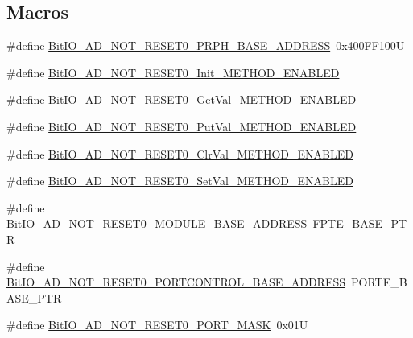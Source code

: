\subsection*{Macros}
\begin{DoxyCompactItemize}
\item 
\#define \hyperlink{group___bit_i_o___a_d___n_o_t___r_e_s_e_t0__module_ga437949927fe2782ca297b0acd3cacffa}{Bit\-I\-O\-\_\-\-A\-D\-\_\-\-N\-O\-T\-\_\-\-R\-E\-S\-E\-T0\-\_\-\-P\-R\-P\-H\-\_\-\-B\-A\-S\-E\-\_\-\-A\-D\-D\-R\-E\-S\-S}~0x400\-F\-F100\-U
\item 
\#define \hyperlink{group___bit_i_o___a_d___n_o_t___r_e_s_e_t0__module_ga95951412f710bccbd47b14a4e7c657a2}{Bit\-I\-O\-\_\-\-A\-D\-\_\-\-N\-O\-T\-\_\-\-R\-E\-S\-E\-T0\-\_\-\-Init\-\_\-\-M\-E\-T\-H\-O\-D\-\_\-\-E\-N\-A\-B\-L\-E\-D}
\item 
\#define \hyperlink{group___bit_i_o___a_d___n_o_t___r_e_s_e_t0__module_gaa8ca61ecfbf61ff04f201a68606fa657}{Bit\-I\-O\-\_\-\-A\-D\-\_\-\-N\-O\-T\-\_\-\-R\-E\-S\-E\-T0\-\_\-\-Get\-Val\-\_\-\-M\-E\-T\-H\-O\-D\-\_\-\-E\-N\-A\-B\-L\-E\-D}
\item 
\#define \hyperlink{group___bit_i_o___a_d___n_o_t___r_e_s_e_t0__module_ga867a3bb8028ec506efd23bc79b0e6b21}{Bit\-I\-O\-\_\-\-A\-D\-\_\-\-N\-O\-T\-\_\-\-R\-E\-S\-E\-T0\-\_\-\-Put\-Val\-\_\-\-M\-E\-T\-H\-O\-D\-\_\-\-E\-N\-A\-B\-L\-E\-D}
\item 
\#define \hyperlink{group___bit_i_o___a_d___n_o_t___r_e_s_e_t0__module_ga0a0deec1c16e2defbbdfe942a86d1993}{Bit\-I\-O\-\_\-\-A\-D\-\_\-\-N\-O\-T\-\_\-\-R\-E\-S\-E\-T0\-\_\-\-Clr\-Val\-\_\-\-M\-E\-T\-H\-O\-D\-\_\-\-E\-N\-A\-B\-L\-E\-D}
\item 
\#define \hyperlink{group___bit_i_o___a_d___n_o_t___r_e_s_e_t0__module_gaf9c1d2ae00139c39804a0c14b6395d98}{Bit\-I\-O\-\_\-\-A\-D\-\_\-\-N\-O\-T\-\_\-\-R\-E\-S\-E\-T0\-\_\-\-Set\-Val\-\_\-\-M\-E\-T\-H\-O\-D\-\_\-\-E\-N\-A\-B\-L\-E\-D}
\item 
\#define \hyperlink{group___bit_i_o___a_d___n_o_t___r_e_s_e_t0__module_ga7840b3d566946740b40cd5a185e16785}{Bit\-I\-O\-\_\-\-A\-D\-\_\-\-N\-O\-T\-\_\-\-R\-E\-S\-E\-T0\-\_\-\-M\-O\-D\-U\-L\-E\-\_\-\-B\-A\-S\-E\-\_\-\-A\-D\-D\-R\-E\-S\-S}~F\-P\-T\-E\-\_\-\-B\-A\-S\-E\-\_\-\-P\-T\-R
\item 
\#define \hyperlink{group___bit_i_o___a_d___n_o_t___r_e_s_e_t0__module_ga7271a340d6396d24f06af1ce2bab3026}{Bit\-I\-O\-\_\-\-A\-D\-\_\-\-N\-O\-T\-\_\-\-R\-E\-S\-E\-T0\-\_\-\-P\-O\-R\-T\-C\-O\-N\-T\-R\-O\-L\-\_\-\-B\-A\-S\-E\-\_\-\-A\-D\-D\-R\-E\-S\-S}~P\-O\-R\-T\-E\-\_\-\-B\-A\-S\-E\-\_\-\-P\-T\-R
\item 
\#define \hyperlink{group___bit_i_o___a_d___n_o_t___r_e_s_e_t0__module_ga6ef43ca6d062a3d1a906357a374d0e00}{Bit\-I\-O\-\_\-\-A\-D\-\_\-\-N\-O\-T\-\_\-\-R\-E\-S\-E\-T0\-\_\-\-P\-O\-R\-T\-\_\-\-M\-A\-S\-K}~0x01\-U
\end{DoxyCompactItemize}
